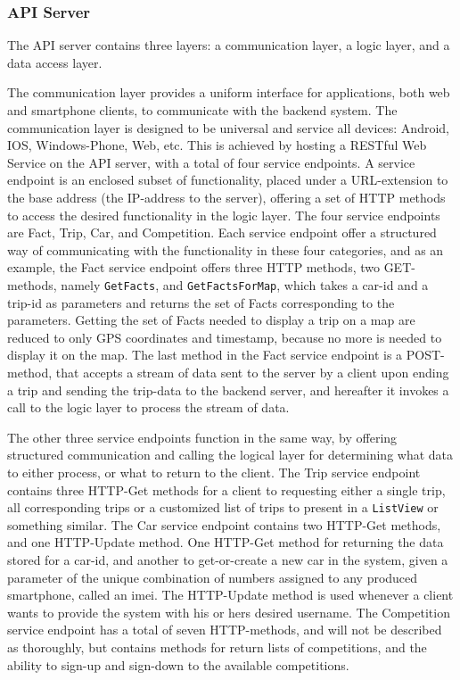 \subsubsection{API Server}\label{sec:api_server}
The API server contains three layers: a communication layer, a logic layer, and a data access layer.

The communication layer provides a uniform interface for applications, both web and smartphone clients, to communicate with the backend system. The communication layer is designed to be universal and service all devices: Android, IOS, Windows-Phone, Web, etc. This is achieved by hosting a RESTful Web Service on the API server, with a total of four service endpoints. A service endpoint is an enclosed subset of functionality, placed under a URL-extension to the base address (the IP-address to the server), offering a set of HTTP methods to access the desired functionality in the logic layer. The four service endpoints are Fact, Trip, Car, and Competition. Each service endpoint offer a structured way of communicating with the functionality in these four categories, and as an example, the Fact service endpoint offers three HTTP methods, two GET-methods, namely \texttt{GetFacts}, and \texttt{GetFactsForMap}, which takes a car-id and a trip-id as parameters and returns the set of Facts corresponding to the parameters. Getting the set of Facts needed to display a trip on a map are reduced to only GPS coordinates and timestamp, because no more is needed to display it on the map. The last method in the Fact service endpoint is a POST-method, that accepts a stream of data sent to the server by a client upon ending a trip and sending the trip-data to the backend server, and hereafter it invokes a call to the logic layer to process the stream of data.

The other three service endpoints function in the same way, by offering structured communication and calling the logical layer for determining what data to either process, or what to return to the client. The Trip service endpoint contains three HTTP-Get methods for a client to requesting either a single trip, all corresponding trips or a customized list of trips to present in a \texttt{ListView} or something similar. The Car service endpoint contains two HTTP-Get methods, and one HTTP-Update method. One HTTP-Get method for returning the data stored for a car-id, and another to get-or-create a new car in the system, given a parameter of the unique combination of numbers assigned to any produced smartphone, called an imei. The HTTP-Update method is used whenever a client wants to provide the system with his or hers desired username. The Competition service endpoint has a total of seven HTTP-methods, and will not be described as thoroughly, but contains methods for return lists of competitions, and the ability to sign-up and sign-down to the available competitions.

